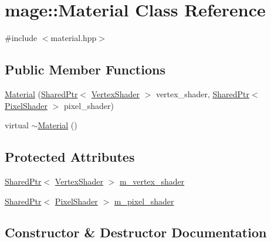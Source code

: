 \hypertarget{classmage_1_1_material}{}\section{mage\+:\+:Material Class Reference}
\label{classmage_1_1_material}


{\ttfamily \#include $<$material.\+hpp$>$}

\subsection*{Public Member Functions}
\begin{DoxyCompactItemize}
\item 
\hyperlink{classmage_1_1_material_a60ff5af1b5f634568954e9a0b714e85b}{Material} (\hyperlink{namespacemage_a1e01ae66713838a7a67d30e44c67703e}{Shared\+Ptr}$<$ \hyperlink{classmage_1_1_vertex_shader}{Vertex\+Shader} $>$ vertex\+\_\+shader, \hyperlink{namespacemage_a1e01ae66713838a7a67d30e44c67703e}{Shared\+Ptr}$<$ \hyperlink{classmage_1_1_pixel_shader}{Pixel\+Shader} $>$ pixel\+\_\+shader)
\item 
virtual \hyperlink{classmage_1_1_material_a536bc060adb4a43607f2469f81dc5ce3}{$\sim$\+Material} ()
\end{DoxyCompactItemize}
\subsection*{Protected Attributes}
\begin{DoxyCompactItemize}
\item 
\hyperlink{namespacemage_a1e01ae66713838a7a67d30e44c67703e}{Shared\+Ptr}$<$ \hyperlink{classmage_1_1_vertex_shader}{Vertex\+Shader} $>$ \hyperlink{classmage_1_1_material_a55d6d0a8a6c4205406177a8de31d2d23}{m\+\_\+vertex\+\_\+shader}
\item 
\hyperlink{namespacemage_a1e01ae66713838a7a67d30e44c67703e}{Shared\+Ptr}$<$ \hyperlink{classmage_1_1_pixel_shader}{Pixel\+Shader} $>$ \hyperlink{classmage_1_1_material_a2c8cc11322217b70c0cdab7de5188f3d}{m\+\_\+pixel\+\_\+shader}
\end{DoxyCompactItemize}


\subsection{Constructor \& Destructor Documentation}
\hypertarget{classmage_1_1_material_a60ff5af1b5f634568954e9a0b714e85b}{}\label{classmage_1_1_material_a60ff5af1b5f634568954e9a0b714e85b} 
